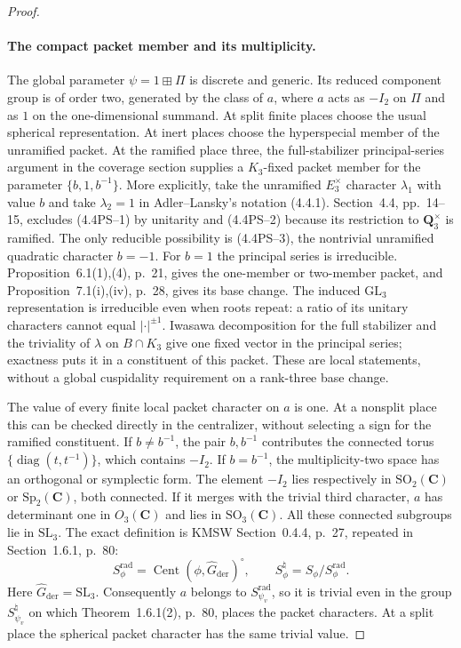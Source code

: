 \begin{proof}
\paragraph{The compact packet member and its multiplicity.}
The global parameter $\psi=1\boxplus\Pi$ is discrete and generic.
Its reduced component group is of order two, generated by the
class of $a$, where $a$ acts as $-I_2$ on $\Pi$ and as $1$ on
the one-dimensional summand. At split finite places choose the
usual spherical representation. At inert places choose the
hyperspecial member of the unramified packet. At the ramified
place three, the full-stabilizer principal-series argument in
the coverage section supplies a $K_3$-fixed packet member for
the parameter $\{b,1,b^{-1}\}$. More explicitly, take the
unramified $E_3^\times$ character $\lambda_1$ with value $b$
and take $\lambda_2=1$ in Adler--Lansky's notation (4.4.1).
Section~4.4, pp.~14--15, excludes (4.4PS--1) by unitarity
and (4.4PS--2) because its restriction to $\mathbf Q_3^\times$
is ramified. The only reducible possibility is (4.4PS--3),
the nontrivial unramified quadratic character $b=-1$.
For $b=1$ the principal series is irreducible.
Proposition~6.1(1),(4), p.~21, gives the one-member or
two-member packet, and Proposition~7.1(i),(iv), p.~28,
gives its base change. The induced $\mathrm{GL}_3$ representation
is irreducible even when roots repeat: a ratio of its unitary
characters cannot equal $|\cdot|^{\pm1}$.
Iwasawa decomposition for the full stabilizer and the triviality
of $\lambda$ on $B\cap K_3$ give one fixed vector in the
principal series; exactness puts it in a constituent of this
packet. These are local statements, without a global
cuspidality requirement on a rank-three base change.

The value of every finite local packet character on $a$ is one.
At a nonsplit place this can be checked directly in the
centralizer, without selecting a sign for the ramified
constituent. If $b\ne b^{-1}$, the pair $b,b^{-1}$ contributes
the connected torus $\{\operatorname{diag}(t,t^{-1})\}$,
which contains $-I_2$. If $b=b^{-1}$, the multiplicity-two
space has an orthogonal or symplectic form. The element
$-I_2$ lies respectively in $\mathrm{SO}_2(\mathbf C)$ or
$\mathrm{Sp}_2(\mathbf C)$, both connected. If it merges with
the trivial third character, $a$ has determinant one in
$O_3(\mathbf C)$ and lies in $\mathrm{SO}_3(\mathbf C)$.
All these connected subgroups lie in $\mathrm{SL}_3$.
The exact definition is KMSW Section~0.4.4, p.~27,
repeated in Section~1.6.1, p.~80:
\[
 S_\phi^{\mathrm{rad}}=
       \operatorname{Cent}(\phi,\widehat G_{\mathrm{der}})^\circ,
 \qquad S_\phi^{\natural}=S_\phi/S_\phi^{\mathrm{rad}}.
\]
Here $\widehat G_{\mathrm{der}}=\mathrm{SL}_3$.
Consequently $a$ belongs to $S_{\psi_v}^{\mathrm{rad}}$, so
it is trivial even in the group $S_{\psi_v}^{\natural}$ on
which Theorem~1.6.1(2), p.~80, places the packet characters.
At a split place the
spherical packet character has the same trivial value.


\end{proof}
